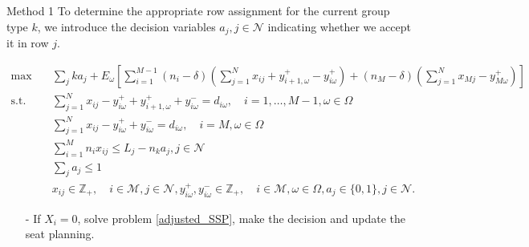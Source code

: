   \begin{frame}{Method 1}
    \scriptsize
    To determine the appropriate row assignment for the current group type $k$, we introduce the decision variables $a_j, j \in \mathcal{N}$ indicating whether we accept it in row $j$.
    
      \begin{tiny}
        \begin{equation}\label{adjusted_SSP}
        \begin{aligned}
        \max \quad & \sum_{j} k a_j + E_{\omega}\left[\sum_{i=1}^{M-1} (n_i-\delta) (\sum_{j= 1}^{N} x_{ij} + y_{i+1,\omega}^{+} - y_{i \omega}^{+}) + (n_{M}-\delta) (\sum_{j= 1}^{N} x_{Mj} - y_{M \omega}^{+})\right] \\
        \text {s.t.} \quad & \sum_{j= 1}^{N} x_{ij}-y_{i \omega}^{+}+
        y_{i+1, \omega}^{+} + y_{i \omega}^{-}=d_{i \omega}, \quad i = 1,\ldots,M-1, \omega \in \Omega \\
        & \sum_{j= 1}^{N} x_{ij} -y_{i \omega}^{+}+y_{i \omega}^{-}=d_{i \omega}, \quad i = M, \omega \in \Omega \\
        & \sum_{i=1}^{M} n_{i} x_{ij} \leq L_j - n_k a_j, j \in \mathcal{N} \\
        & \sum_{j} a_j \leq 1 \\
        & x_{ij} \in \mathbb{Z}_{+}, \quad i \in \mathcal{M}, j \in \mathcal{N}, y_{i \omega}^{+}, y_{i \omega}^{-} \in \mathbb{Z}_{+}, \quad i \in \mathcal{M}, \omega \in \Omega,  a_j \in \{0,1\}, j \in \mathcal{N}.
        \end{aligned}
      \end{equation}
    \end{tiny}
    \begin{itemize}      
      \item[-] If $X_i = 0$, solve problem \eqref{adjusted_SSP}, make the decision and update the seat planning.
    \end{itemize}
  \end{frame}

      
      
